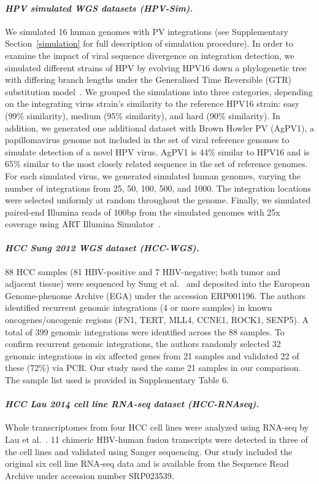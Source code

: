 \documentclass{bmcart}
\begin{document}
\paragraph{\emph{HPV simulated WGS datasets (HPV-Sim).}}
We simulated 16 human genomes with PV integrations (see Supplementary Section~\ref{simulation} for full description of simulation procedure).  In order to examine the impact of viral sequence divergence on integration detection, we simulated different strains of HPV by evolving HPV16 down a phylogenetic tree with differing branch lengths under the Generalised Time Reversible (GTR) substitution model~\cite{Tavare1986}.  We grouped the simulations into three categories, depending on the integrating virus strain's similarity to the reference HPV16 strain: easy (99\% similarity), medium (95\% similarity), and hard (90\% similarity).  In addition, we generated one additional dataset with Brown Howler PV (AgPV1), a papillomavirus genome not included in the set of viral reference genomes to simulate detection of a novel HPV virus.  AgPV1 is 44\% similar to HPV16 and is 65\% similar to the most closely related sequence in the set of reference genomes.  For each simulated virus, we generated simulated human genomes, varying the number of integrations from 25, 50, 100, 500, and 1000.  The integration locations were selected uniformly at random throughout the genome.  Finally, we simulated paired-end Illumina reads of 100bp from the simulated genomes with 25x coverage using ART Illumina Simulator~\cite{Huang2012}.  


\paragraph{\emph{HCC Sung 2012 WGS dataset (HCC-WGS).}}
88 HCC samples (81 HBV-positive and 7 HBV-negative; both tumor and adjacent tissue) were sequenced by Sung et al.~\cite{Sung2012} and deposited into the European Genome-phenome Archive (EGA) under the accession ERP001196.  The authors identified recurrent genomic integrations (4 or more samples) in known oncogenes/oncogenic regions (FN1, TERT, MLL4, CCNE1, ROCK1, SENP5).  A total of 399 genomic integrations were identified across the 88 samples.  To confirm recurrent genomic integrations, the authors randomly selected 32 genomic integrations in six affected genes from 21 samples and validated 22 of these (72\%) via PCR.  Our study used the same 21 samples in our comparison.  The sample list used is provided in Supplementary Table 6. 

\paragraph{\emph{HCC Lau 2014 cell line RNA-seq dataset (HCC-RNAseq).}}
Whole transcriptomes from four HCC cell lines were analyzed using RNA-seq by Lau et al.~\cite{Lau2014}.  11 chimeric HBV-human fusion transcripts were detected in three of the cell lines and validated using Sanger sequencing.  Our study included the original six cell line RNA-seq data and is available from the Sequence Read Archive under accession number SRP023539.
\end{document}
